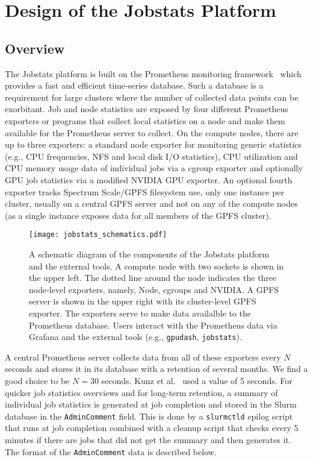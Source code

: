 \section{Design of the Jobstats Platform}
\label{jobstats_design}

\subsection{Overview}
The Jobstats platform is built on the Prometheus monitoring framework~\cite{prometheus} which provides a fast and efficient time-series database. Such a database is a requirement for large clusters where the number of collected data points can be exorbitant. Job and node statistics are exposed by four different Prometheus exporters or programs that collect local statistics on a node and make them available for the Prometheus server to collect. On the compute nodes, there are up to three exporters: a standard node exporter for monitoring generic statistics (e.g., CPU frequencies, NFS and local disk I/O statistics), CPU utilization and CPU memory usage data of individual jobs via a cgroup exporter and optionally GPU job statistics via a modified NVIDIA GPU exporter. An optional fourth exporter tracks Spectrum Scale/GPFS filesystem use, only one instance per cluster, usually on a central GPFS server and not on any of the compute nodes (as a single instance exposes data for all members of the GPFS cluster).

\begin{figure}
  \centering
  \texttt{[image: jobstats\_schematics.pdf]}
  \caption{A schematic diagram of the components of the Jobstats platform and the external tools. A compute node with two sockets is shown in the upper left. The dotted line around the node indicates the three node-level exporters, namely, Node, cgroups and NVIDIA. A GPFS server is shown in the upper right with its cluster-level GPFS exporter. The exporters serve to make data availalble to the Prometheus database. Users interact with the Prometheus data via Grafana and the external tools (e.g., \texttt{gpudash}, \texttt{jobstats}).}
\end{figure}

A central Prometheus server collects data from all of these exporters every $N$ seconds and stores it in its database with a retention of several months. We find a good choice to be $N=30$ seconds. Kunz et al.~\cite{pascal} used a value of 5 seconds. For quicker job statistics overviews and for long-term retention, a summary of individual job statistics is generated at job completion and stored in the Slurm database in the \texttt{AdminComment} field. This is done by a \texttt{slurmctld} epilog script that runs at job completion combined with a cleanup script that checks every 5 minutes if there are jobs that did not get the summary and then generates it. The format of the \texttt{AdminComment} data is described below.

